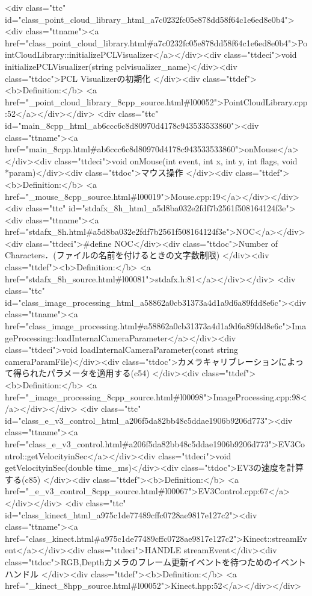 <div class="ttc" id="class_point_cloud_library_html_a7c0232fc05e878dd58f64c1e6ed8e0b4"><div class="ttname"><a href="class_point_cloud_library.html#a7c0232fc05e878dd58f64c1e6ed8e0b4">PointCloudLibrary::initializePCLVisualizer</a></div><div class="ttdeci">void initializePCLVisualizer(string pclvisualizer_name)</div><div class="ttdoc">PCL Visualizerの初期化 </div><div class="ttdef"><b>Definition:</b> <a href="_point_cloud_library_8cpp_source.html#l00052">PointCloudLibrary.cpp:52</a></div></div>
<div class="ttc" id="main_8cpp_html_ab6ccc6c8d80970d4178c943533533860"><div class="ttname"><a href="main_8cpp.html#ab6ccc6c8d80970d4178c943533533860">onMouse</a></div><div class="ttdeci">void onMouse(int event, int x, int y, int flags, void *param)</div><div class="ttdoc">マウス操作 </div><div class="ttdef"><b>Definition:</b> <a href="_mouse_8cpp_source.html#l00019">Mouse.cpp:19</a></div></div>
<div class="ttc" id="stdafx_8h_html_a5d8ba032e2fdf7b2561f508164124f3e"><div class="ttname"><a href="stdafx_8h.html#a5d8ba032e2fdf7b2561f508164124f3e">NOC</a></div><div class="ttdeci">#define NOC</div><div class="ttdoc">Number of Characters．(ファイルの名前を付けるときの文字数制限) </div><div class="ttdef"><b>Definition:</b> <a href="stdafx_8h_source.html#l00081">stdafx.h:81</a></div></div>
<div class="ttc" id="class_image_processing_html_a58862a0cb31373a4d1a9d6a89fdd8e6c"><div class="ttname"><a href="class_image_processing.html#a58862a0cb31373a4d1a9d6a89fdd8e6c">ImageProcessing::loadInternalCameraParameter</a></div><div class="ttdeci">void loadInternalCameraParameter(const string cameraParamFile)</div><div class="ttdoc">カメラキャリブレーションによって得られたパラメータを適用する(c54) </div><div class="ttdef"><b>Definition:</b> <a href="_image_processing_8cpp_source.html#l00098">ImageProcessing.cpp:98</a></div></div>
<div class="ttc" id="class_e_v3_control_html_a206f5da82bb48c5ddae1906b9206d773"><div class="ttname"><a href="class_e_v3_control.html#a206f5da82bb48c5ddae1906b9206d773">EV3Control::getVelocityinSec</a></div><div class="ttdeci">void getVelocityinSec(double time_ms)</div><div class="ttdoc">EV3の速度を計算する(c85) </div><div class="ttdef"><b>Definition:</b> <a href="_e_v3_control_8cpp_source.html#l00067">EV3Control.cpp:67</a></div></div>
<div class="ttc" id="class_kinect_html_a975c1de77489cffc0728ae9817e127c2"><div class="ttname"><a href="class_kinect.html#a975c1de77489cffc0728ae9817e127c2">Kinect::streamEvent</a></div><div class="ttdeci">HANDLE streamEvent</div><div class="ttdoc">RGB,Depthカメラのフレーム更新イベントを待つためのイベントハンドル </div><div class="ttdef"><b>Definition:</b> <a href="_kinect_8hpp_source.html#l00052">Kinect.hpp:52</a></div></div>
